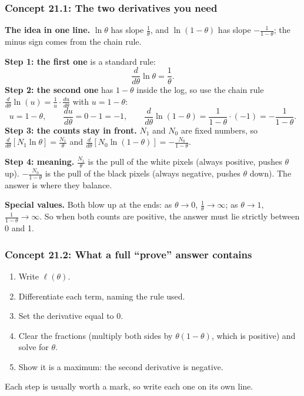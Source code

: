 \documentclass[12pt,a4paper]{article}
\begin{document}
\subsubsection{Concept 21.1: The two derivatives you need}\label{c21-1}

\textbf{The idea in one line.} $\ln\theta$ has slope $\frac1\theta$, and $\ln(1-\theta)$ has slope $-\frac{1}{1-\theta}$; the minus sign comes from the chain rule.

\textbf{Step 1: the first one} is a standard rule:
\[
\frac{d}{d\theta}\ln\theta=\frac1\theta .
\]
\textbf{Step 2: the second one} has $1-\theta$ inside the log, so use the chain rule $\frac{d}{d\theta}\ln(u)=\frac1u\cdot\frac{du}{d\theta}$ with $u=1-\theta$:
\[
u=1-\theta,\qquad\frac{du}{d\theta}=0-1=-1,\qquad \frac{d}{d\theta}\ln(1-\theta)=\frac{1}{1-\theta}\cdot(-1)=-\frac{1}{1-\theta}.
\]
\textbf{Step 3: the counts stay in front.} $N_1$ and $N_0$ are fixed numbers, so $\frac{d}{d\theta}[N_1\ln\theta]=\frac{N_1}{\theta}$ and $\frac{d}{d\theta}[N_0\ln(1-\theta)]=-\frac{N_0}{1-\theta}$.

\textbf{Step 4: meaning.} $\frac{N_1}{\theta}$ is the pull of the white pixels (always positive, pushes $\theta$ up). $-\frac{N_0}{1-\theta}$ is the pull of the black pixels (always negative, pushes $\theta$ down). The answer is where they balance.

\textbf{Special values.} Both blow up at the ends: as $\theta\to0$, $\frac1\theta\to\infty$; as $\theta\to1$, $\frac{1}{1-\theta}\to\infty$. So when both counts are positive, the answer must lie strictly between 0 and 1.

\subsubsection{Concept 21.2: What a full ``prove'' answer contains}\label{c21-2}

\begin{enumerate}[nosep]
  \item Write $\ell(\theta)$.
  \item Differentiate each term, naming the rule used.
  \item Set the derivative equal to 0.
  \item Clear the fractions (multiply both sides by $\theta(1-\theta)$, which is positive) and solve for $\theta$.
  \item Show it is a maximum: the second derivative is negative.
\end{enumerate}
Each step is usually worth a mark, so write each one on its own line.
\end{document}
